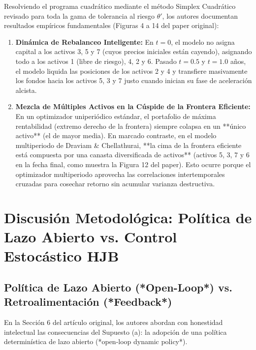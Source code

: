 \documentclass[11pt,a4paper]{report}
\numberwithin{equation}{chapter}
\begin{document}
Resolviendo el programa cuadrático mediante el método Simplex Cuadrático revisado para toda la gama de tolerancia al riesgo $\theta'$, los autores documentan resultados empíricos fundamentales (Figuras 4 a 14 del paper original):
\begin{enumerate}
    \item \textbf{Dinámica de Rebalanceo Inteligente:} En $t=0$, el modelo no asigna capital a los activos 3, 5 y 7 (cuyos precios iniciales están cayendo), asignando todo a los activos 1 (libre de riesgo), 4, 2 y 6. Pasado $t=0.5$ y $t=1.0$ años, el modelo liquida las posiciones de los activos 2 y 4 y transfiere masivamente los fondos hacia los activos 5, 3 y 7 justo cuando inician su fase de aceleración alcista.
    \item \textbf{Mezcla de Múltiples Activos en la Cúspide de la Frontera Eficiente:} En un optimizador uniperiódico estándar, el portafolio de máxima rentabilidad (extremo derecho de la frontera) siempre colapsa en un **único activo** (el de mayor media). En marcado contraste, en el modelo multiperiodo de Draviam \& Chellathurai, **la cima de la frontera eficiente está compuesta por una canasta diversificada de activos** (activos 5, 3, 7 y 6 en la fecha final, como muestra la Figura 12 del paper). Esto ocurre porque el optimizador multiperiodo aprovecha las correlaciones intertemporales cruzadas para cosechar retorno sin acumular varianza destructiva.
\end{enumerate}

\chapter{Discusión Metodológica: Política de Lazo Abierto vs. Control Estocástico HJB}

\section{Política de Lazo Abierto (*Open-Loop*) vs. Retroalimentación (*Feedback*)}

En la Sección 6 del artículo original, los autores abordan con honestidad intelectual las consecuencias del Supuesto (a): la adopción de una política determinística de lazo abierto (*open-loop dynamic policy*).
\end{document}
